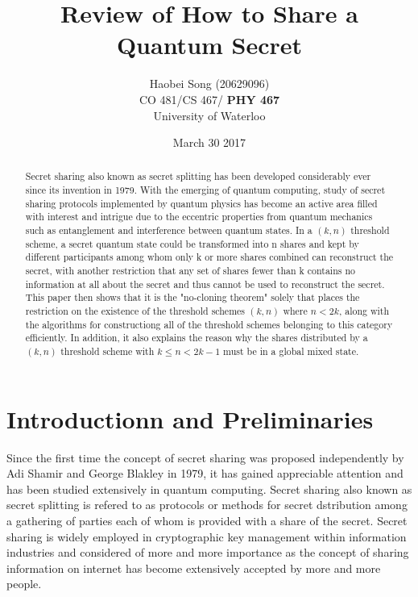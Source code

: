 \documentclass[12pt]{article}
\title{\textbf{Review of How to Share a Quantum Secret \cite{review}}} \author{Haobei Song (20629096)\\CO 481/CS 467/ \textbf{PHY 467}\\University of Waterloo}
\date{March 30 2017}
\begin{document}
 

\maketitle
\newpage


\begin{abstract}
	Secret sharing also known as secret splitting has been developed considerably ever since its invention in 1979. With the emerging of quantum computing, study of secret sharing protocols implemented by quantum physics has become an active area filled with interest and intrigue due to the eccentric properties from quantum mechanics such as entanglement and interference between quantum states.
	In a $(k,n)$ threshold scheme, a secret quantum state could be transformed into n shares and kept by different participants among whom only k or more shares combined can reconstruct the secret, with another restriction that any set of shares fewer than k contains no information at all about the secret and thus cannot be used to reconstruct the secret.
	This paper then shows that it is the "no-cloning theorem" solely that places the restriction on the existence of the threshold schemes $(k, n)$ where $n < 2k$, along with the algorithms for constructiong all of the threshold schemes belonging to this category efficiently. In addition, it also explains the reason why the shares distributed by a $(k,n)$ threshold scheme with $k \leq n < 2k-1$ must be in a global mixed state.
	
\end{abstract}

\section{Introductionn and Preliminaries}
Since the first time the concept of secret sharing was proposed independently by Adi Shamir\cite{Shamir} and George Blakley\cite{Blakley} in 1979, it has gained appreciable attention and has been studied extensively in quantum computing.
	Secret sharing also known as secret splitting is refered to as protocols or methods for secret dstribution among a gathering of parties each of whom is provided with a share of the secret. 
	Secret sharing is widely employed in cryptographic key management within information industries and considered of more and more importance as the concept of sharing information on internet has become extensively accepted by more and more people.
\end{document}

